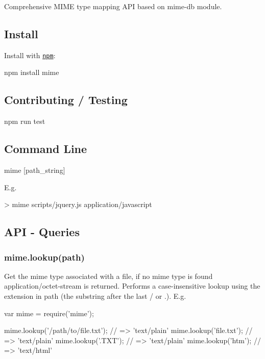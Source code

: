 Comprehensive M\+I\+ME type mapping A\+PI based on mime-\/db module.

\subsection*{Install}

Install with \href{http://github.com/isaacs/npm}{\tt npm}\+: \begin{DoxyVerb}npm install mime
\end{DoxyVerb}


\subsection*{Contributing / Testing}

\begin{DoxyVerb}npm run test
\end{DoxyVerb}


\subsection*{Command Line}

\begin{DoxyVerb}mime [path_string]
\end{DoxyVerb}


E.\+g. \begin{DoxyVerb}> mime scripts/jquery.js
application/javascript
\end{DoxyVerb}


\subsection*{A\+PI -\/ Queries}

\subsubsection*{mime.\+lookup(path)}

Get the mime type associated with a file, if no mime type is found {\ttfamily application/octet-\/stream} is returned. Performs a case-\/insensitive lookup using the extension in {\ttfamily path} (the substring after the last \textquotesingle{}/\textquotesingle{} or \textquotesingle{}.\textquotesingle{}). E.\+g.


\begin{DoxyCode}
var mime = require('mime');

mime.lookup('/path/to/file.txt');         // => 'text/plain'
mime.lookup('file.txt');                  // => 'text/plain'
mime.lookup('.TXT');                      // => 'text/plain'
mime.lookup('htm');                       // => 'text/html'
\end{DoxyCode}


